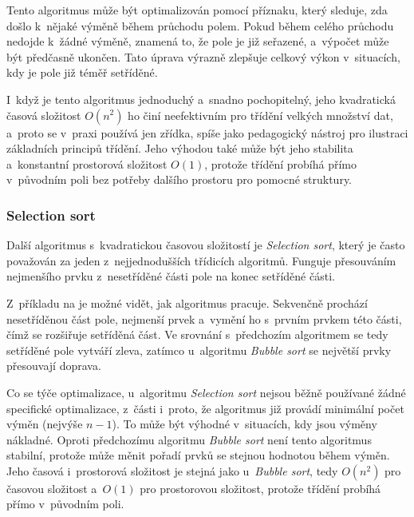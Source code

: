 \begin{listing}[ht]
    
    \caption{Pseudokód algoritmu Bubble sort}
    \label{lst:bubbleSort}
\end{listing}

Tento algoritmus může být optimalizován pomocí příznaku, který sleduje, zda došlo k~nějaké výměně během průchodu polem.
Pokud během celého průchodu nedojde k~žádné výměně, znamená to, že pole je již seřazené, a~výpočet může být předčasně ukončen.
Tato úprava výrazně zlepšuje celkový výkon v~situacích, kdy je pole již téměř setříděné.

I~když je tento algoritmus jednoduchý a~snadno pochopitelný, jeho kvadratická časová složitost $O(n^2)$ ho činí neefektivním pro třídění velkých množství dat, a~proto se v~praxi používá jen zřídka, spíše jako pedagogický nástroj pro ilustraci základních principů třídění.
Jeho výhodou také může být jeho stabilita a~konstantní prostorová složitost $O(1)$, protože třídění probíhá přímo v~původním poli bez potřeby dalšího prostoru pro pomocné struktury.~\cite{morin2013}

\subsubsection*{Selection sort}

Další algoritmus s~kvadratickou časovou složitostí je \textit{Selection sort}, který je často považován za jeden z~nejjednodušších třídicích algoritmů.
Funguje přesouváním nejmenšího prvku z~nesetříděné části pole na konec setříděné části.~\cite{morin2013}

Z~příkladu na  je možné vidět, jak algoritmus pracuje.
Sekvenčně prochází nesetříděnou část pole,  nejmenší prvek a~vymění ho s~prvním prvkem této části, čímž se rozšiřuje setříděná část.
Ve srovnání s~předchozím algoritmem se tedy setříděné pole vytváří zleva, zatímco u~algoritmu \textit{Bubble sort} se největší prvky přesouvají doprava.

\begin{listing}[ht]
    
    \caption{Pseudokód algoritmu Selection sort}
    \label{lst:selectionSort}
\end{listing}

Co se týče optimalizace, u~algoritmu \textit{Selection sort} nejsou běžně používané žádné specifické optimalizace, z~části i~proto, že algoritmus již provádí minimální počet výměn (nejvýše $n-1$).
To může být výhodné v~situacích, kdy jsou výměny nákladné.
Oproti předchozímu algoritmu \textit{Bubble sort} není tento algoritmus stabilní, protože může měnit pořadí prvků se stejnou hodnotou během výměn.
Jeho časová i~prostorová složitost je stejná jako u~\textit{Bubble sort}, tedy $O(n^2)$ pro časovou složitost a~$O(1)$ pro prostorovou složitost, protože třídění probíhá přímo v~původním poli.~\cite{morin2013}

